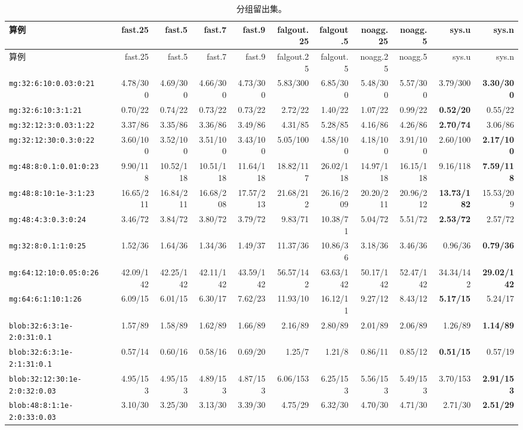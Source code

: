 {\tiny\setlength{\tabcolsep}{2.5pt}
\begin{longtable}{lrrrrrrrrrr}
\caption{分组留出集。}\\
\toprule
算例 & fast.25 & fast.5 & fast.7 & fast.9 & falgout.25 & falgout.5 & noagg.25 & noagg.5 & sys.u & sys.n \\
\midrule
\endfirsthead
\toprule
算例 & fast.25 & fast.5 & fast.7 & fast.9 & falgout.25 & falgout.5 & noagg.25 & noagg.5 & sys.u & sys.n \\
\midrule
\endhead
\bottomrule
\endlastfoot
\texttt{mg:32:6:10:0.03:0:21} & 4.78/300 & 4.69/300 & 4.66/300 & 4.73/300 & 5.83/300 & 6.85/300 & 5.48/300 & 5.57/300 & 3.79/300 & \textbf{3.30/300} \\
\texttt{mg:32:6:10:3:1:21} & 0.70/22 & 0.74/22 & 0.73/22 & 0.73/22 & 2.72/22 & 1.40/22 & 1.07/22 & 0.99/22 & \textbf{0.52/20} & 0.55/22 \\
\texttt{mg:32:12:3:0.03:1:22} & 3.37/86 & 3.35/86 & 3.36/86 & 3.49/86 & 4.31/85 & 5.28/85 & 4.16/86 & 4.26/86 & \textbf{2.70/74} & 3.06/86 \\
\texttt{mg:32:12:30:0.3:0:22} & 3.60/100 & 3.52/100 & 3.51/100 & 3.43/100 & 5.05/100 & 4.58/100 & 4.18/100 & 3.91/100 & 2.60/100 & \textbf{2.17/100} \\
\texttt{mg:48:8:0.1:0.01:0:23} & 9.90/118 & 10.52/118 & 10.51/118 & 11.64/118 & 18.82/117 & 26.02/118 & 14.97/118 & 16.15/118 & 9.16/118 & \textbf{7.59/118} \\
\texttt{mg:48:8:10:1e-3:1:23} & 16.65/211 & 16.84/211 & 16.68/208 & 17.57/213 & 21.68/212 & 26.16/209 & 20.20/211 & 20.96/212 & \textbf{13.73/182} & 15.53/209 \\
\texttt{mg:48:4:3:0.3:0:24} & 3.46/72 & 3.84/72 & 3.80/72 & 3.79/72 & 9.83/71 & 10.38/71 & 5.04/72 & 5.51/72 & \textbf{2.53/72} & 2.57/72 \\
\texttt{mg:32:8:0.1:1:0:25} & 1.52/36 & 1.64/36 & 1.34/36 & 1.49/37 & 11.37/36 & 10.86/36 & 3.18/36 & 3.46/36 & 0.96/36 & \textbf{0.79/36} \\
\texttt{mg:64:12:10:0.05:0:26} & 42.09/142 & 42.25/142 & 42.11/142 & 43.59/142 & 56.57/142 & 63.63/142 & 50.17/142 & 52.47/142 & 34.34/142 & \textbf{29.02/142} \\
\texttt{mg:64:6:1:10:1:26} & 6.09/15 & 6.01/15 & 6.30/17 & 7.62/23 & 11.93/10 & 16.12/11 & 9.27/12 & 8.43/12 & \textbf{5.17/15} & 5.24/17 \\
\texttt{blob:32:6:3:1e-2:0:31:0.1} & 1.57/89 & 1.58/89 & 1.62/89 & 1.66/89 & 2.16/89 & 2.80/89 & 2.01/89 & 2.06/89 & 1.26/89 & \textbf{1.14/89} \\
\texttt{blob:32:6:3:1e-2:1:31:0.1} & 0.57/14 & 0.60/16 & 0.58/16 & 0.69/20 & 1.25/7 & 1.21/8 & 0.86/11 & 0.85/12 & \textbf{0.51/15} & 0.57/19 \\
\texttt{blob:32:12:30:1e-2:0:32:0.03} & 4.95/153 & 4.95/153 & 4.89/153 & 4.87/153 & 6.06/153 & 6.25/153 & 5.56/153 & 5.49/153 & 3.70/153 & \textbf{2.91/153} \\
\texttt{blob:48:8:1:1e-2:0:33:0.03} & 3.10/30 & 3.25/30 & 3.13/30 & 3.39/30 & 4.75/29 & 6.32/30 & 4.70/30 & 4.71/30 & 2.71/30 & \textbf{2.51/29} \\
\end{longtable}}
